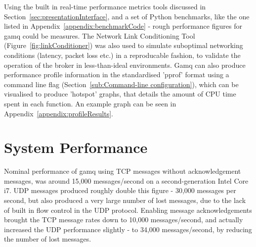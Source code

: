 Using the built in real-time performance metrics tools discussed in
Section~\ref{sec:presentationInterface}, and a set of Python benchmarks, like the one listed
in Appendix~\ref{appendix:benchmarkCode} - rough performance figures for gamq could
be measures. The Network Link Conditioning Tool
(Figure~\ref{fig:linkConditioner}) was also used to simulate suboptimal
networking conditions (latency, packet loss etc.) in a reproducable fashion, to validate the operation of
the broker in less-than-ideal environments. Gamq can also produce performance
profile information in the standardised 'pprof' format using a command line flag
(Section~\ref{sub:Command-line configuration}), which can be visualised to
produce 'hotspot' graphs, that details the amount of CPU time spent in each
function. An example graph can be seen in Appendix~\ref{appendix:profileResults}.

\section{System Performance}
\label{sec:systemPerformance}

Nominal performance of \gls{gamq} using TCP messages without acknowledgement
messages, was around 15,000 messages/second on a second-generation Intel Core
i7. UDP messages produced roughly double this figure - 30,000 messages per
second, but also produced a very large number of lost messages, due to the lack
of built in flow control in the UDP protocol. Enabling message acknowledgements
brought the TCP message rates down to 10,000 messages/second, and actually
increased the UDP performance slightly - to 34,000 messages/second, by reducing
the number of lost messages.
